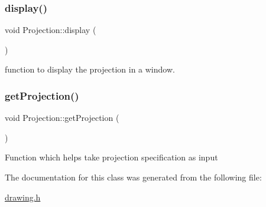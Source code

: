 \subsubsection{\texorpdfstring{display()}{display()}}
{\footnotesize\ttfamily void Projection\+::display (\begin{DoxyParamCaption}{ }\end{DoxyParamCaption})}

function to display the projection in a window. \mbox{\label{class_projection_a3b63599362a22239df0dc6d262c4c54c}} 
\subsubsection{\texorpdfstring{get\+Projection()}{getProjection()}}
{\footnotesize\ttfamily void Projection\+::get\+Projection (\begin{DoxyParamCaption}{ }\end{DoxyParamCaption})}

Function which helps take projection specification as input 

The documentation for this class was generated from the following file\+:\begin{DoxyCompactItemize}
\item 
\mbox{\hyperlink{drawing_8h}{drawing.\+h}}\end{DoxyCompactItemize}
